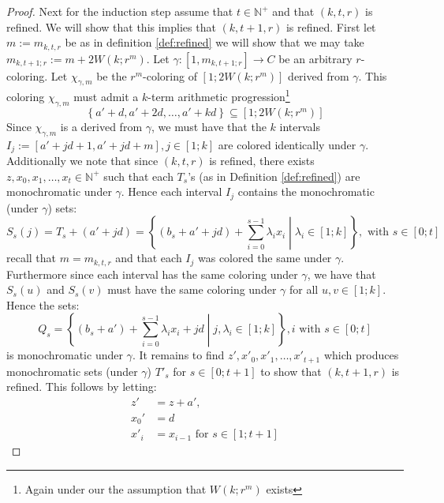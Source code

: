 \begin{proof}
	Next for the induction step assume that $t \in \mathbb{N}^+$ and that $(k, t, r)$ is refined. We will show that this implies that $(k, t + 1, r)$ is refined. First let $m := m_{k, t, r}$ be as in definition \ref{def:refined} we will show that we may take $m_{k, t + 1; r} := m + 2W(k; r^{m})$. Let $\gamma: [1, m_{k, t + 1; r}] \to C$ be an arbitrary $r$-coloring. Let $\chi_{\gamma, m}$ be the $r^m$-coloring of $[1; 2W(k; r^{m})]$ derived from $\gamma$. This coloring $\chi_{\gamma, m}$ must admit a $k$-term arithmetic progression\footnote{Again under our the assumption that $W(k; r^{m})$ exists}
	\begin{equation*}
		\left\{a' + d, a' + 2d, \ldots, a' + kd\right\} \subseteq [1; 2W(k; r^{m})]
	\end{equation*}
	Since $\chi_{\gamma, m}$ is a derived from $\gamma$, we must have that the $k$ intervals $I_j := [a' + jd + 1, a' + jd  + m], j \in [1; k]$ are colored identically under $\gamma$.
	Additionally we note that since $(k, t, r)$ is refined, there exists $z, x_0, x_1, \ldots, x_t \in \mathbb{N}^{+}$ such that each $T_s$'s (as in Definition \ref{def:refined}) are monochromatic under $\gamma$.
	Hence each interval $I_j$ contains the monochromatic (under $\gamma$) sets:
	\begin{equation*}
		S_s(j) = T_{s} + (a' + jd) = \left\{(b_s + a' + jd) + \sum_{i = 0}^{s - 1} \lambda_ix_i \middle| \lambda_i \in [1; k]\right\}, \text{ with }  s \in [0; t]
	\end{equation*}
	recall that $m = m_{k, t, r}$ and that each $I_j$ was colored the same under $\gamma$. Furthermore since each interval has the same coloring under $\gamma$, we have that $S_s(u)$ and $S_s(v)$ must have the same coloring under $\gamma$ for all $u, v \in [1; k]$. Hence the sets:
	\begin{equation*}
		Q_s = \left\{(b_s + a') + \sum_{i = 0}^{s -  1} \lambda_i x_i + jd \middle| j, \lambda_i \in [1; k]\right\},i \text{ with }  s \in [0; t]
	\end{equation*}
	is monochromatic under $\gamma$. It remains to find $z', x'_0, x'_1, \ldots, x'_{t + 1}$ which produces monochromatic sets (under $\gamma$) $T'_s$ for $s \in [0; t+ 1]$ to show that $(k, t + 1, r)$ is refined. This follows by letting:
	\begin{align*}
		z'   & = z + a',                                  \\
		x_0' & = d                                        \\
		x'_i & = x_{i - 1} \text{ for }  s \in [1; t + 1]

\end{align*}
\end{proof}
